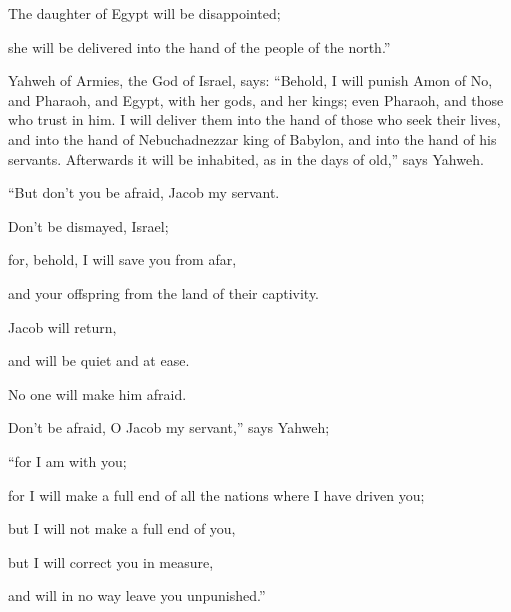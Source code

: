 {\par }{\Q {}The daughter of Egypt will be disappointed;
\par }{\QB she will be delivered into the hand of the people of the north.”
\par }{\PP {}Yahweh of Armies, the God of Israel, says: “Behold, I will punish Amon of No, and Pharaoh, and Egypt, with her gods, and her kings; even Pharaoh, and those who trust in him.
I will deliver them into the hand of those who seek their lives, and into the hand of Nebuchadnezzar king of Babylon, and into the hand of his servants. Afterwards it will be inhabited, as in the days of old,” says Yahweh.
\par }{\Q {}“But don’t you be afraid, Jacob my servant.
\par }{\QB Don’t be dismayed, Israel;
\par }{\Q for, behold, I will save you from afar,
\par }{\QB and your offspring from the land of their captivity.
\par }{\Q Jacob will return,
\par }{\QB and will be quiet and at ease.
\par }{\QB No one will make him afraid.
\par }{\Q {}Don’t be afraid, O Jacob my servant,” says Yahweh;
\par }{\QB “for I am with you;
\par }{\QB for I will make a full end of all the nations where I have driven you;
\par }{\Q but I will not make a full end of you,
\par }{\QB but I will correct you in measure,
\par }{\QB and will in no way leave you unpunished.”

}
